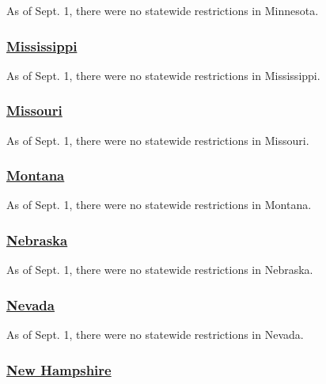 As of Sept. 1, there were no statewide restrictions in Minnesota.

\hypertarget{mississippi}{%
\subsubsection{\texorpdfstring{\href{https://visitmississippi.org/covid-19-travel-alert/}{Mississippi}}{Mississippi}}\label{mississippi}}

As of Sept. 1, there were no statewide restrictions in Mississippi.

\hypertarget{missouri}{%
\subsubsection{\texorpdfstring{\href{https://www.visitmo.com/travel-updates}{Missouri}}{Missouri}}\label{missouri}}

As of Sept. 1, there were no statewide restrictions in Missouri.

\hypertarget{montana}{%
\subsubsection{\texorpdfstring{\href{https://www.visitmt.com/travel-alerts.html}{Montana}}{Montana}}\label{montana}}

As of Sept. 1, there were no statewide restrictions in Montana.

\hypertarget{nebraska}{%
\subsubsection{\texorpdfstring{\href{http://dhhs.ne.gov/Pages/COVID-19-Traveler-Recommendations.aspx}{Nebraska}}{Nebraska}}\label{nebraska}}

As of Sept. 1, there were no statewide restrictions in Nebraska.

\hypertarget{nevada}{%
\subsubsection{\texorpdfstring{\href{https://nvhealthresponse.nv.gov/info/travelers-visitors/}{Nevada}}{Nevada}}\label{nevada}}

As of Sept. 1, there were no statewide restrictions in Nevada.

\hypertarget{new-hampshire}{%
\subsubsection{\texorpdfstring{\href{https://www.covidguidance.nh.gov/out-state-visitors}{New
Hampshire}}{New Hampshire}}\label{new-hampshire}}

